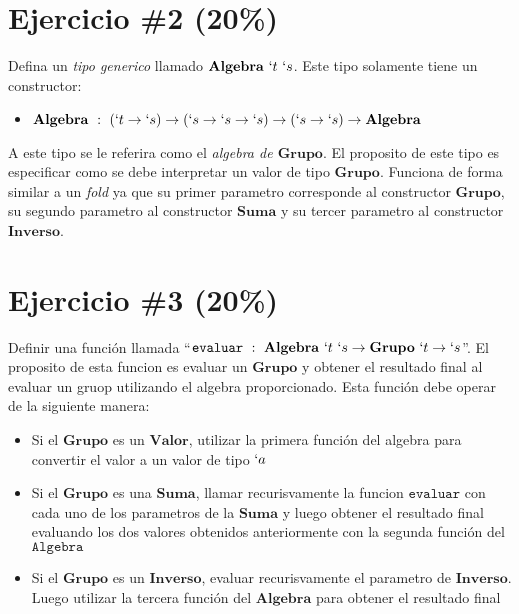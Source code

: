 \documentclass{article}
\begin{document}
\section*{Ejercicio \#2 (20\%)}

Defina un \emph{tipo generico} llamado $\mathbf{Algebra}\ `t\ `s$. Este tipo solamente tiene un constructor:
\begin{itemize}
        \item $\mathbf{Algebra}\ :\ (`t \rightarrow `s)\rightarrow (`s\rightarrow`s\rightarrow`s)\rightarrow(`s \rightarrow `s)\rightarrow\mathbf{Algebra}$
\end{itemize}

A este tipo se le referira como el \emph{algebra de $\mathbf{Grupo}$}. El proposito de este tipo es especificar
como se debe interpretar un valor de tipo $\mathbf{Grupo}$. Funciona de forma similar a un \emph{fold} ya que
su primer parametro corresponde al constructor $\mathbf{Grupo}$, su segundo parametro al constructor $\mathbf{Suma}$
y su tercer parametro al constructor $\mathbf{Inverso}$.

\section*{Ejercicio \#3 (20\%)}

Definir una funci\'on llamada ``$\mathtt{evaluar}\ :\ \mathbf{Algebra}\ `t\ `s\rightarrow\mathbf{Grupo}\ `t\rightarrow`s$''. El proposito de esta funcion es evaluar un $\mathbf{Grupo}$ y
obtener el resultado final al evaluar un gruop utilizando el algebra proporcionado. Esta funci\'on debe operar de la siguiente manera:
\begin{itemize}
        \item{Si el $\mathbf{Grupo}$ es un $\mathbf{Valor}$, utilizar la primera funci\'on del algebra para convertir el valor
                a un valor de tipo $`a$}
        \item{Si el $\mathbf{Grupo}$ es una $\mathbf{Suma}$, llamar recurisvamente la funcion $\mathtt{evaluar}$ con cada
        uno de los parametros de la $\mathbf{Suma}$ y luego obtener el resultado final evaluando los dos valores obtenidos
        anteriormente con la segunda funci\'on del $\mathtt{Algebra}$}
        \item{Si el $\mathbf{Grupo}$ es un $\mathbf{Inverso}$, evaluar recurisvamente el parametro de $\mathbf{Inverso}$. Luego
        utilizar la tercera funci\'on del $\mathbf{Algebra}$ para obtener el resultado final}
\end{itemize}
\end{document}
